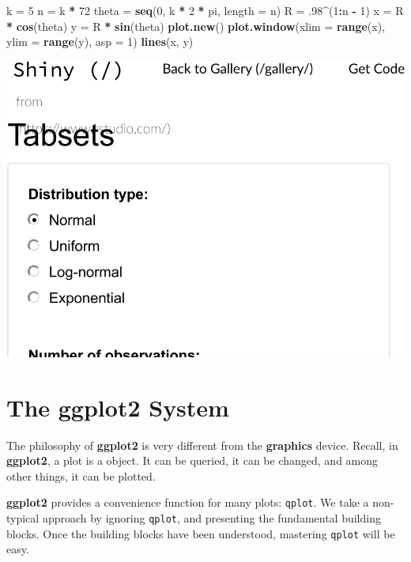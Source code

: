 \documentclass[]{book}
\newenvironment{Shaded}{\begin{snugshade}}{\end{snugshade}}
\newcommand{\DataTypeTok}[1]{\textcolor[rgb]{0.13,0.29,0.53}{#1}}
\newcommand{\DecValTok}[1]{\textcolor[rgb]{0.00,0.00,0.81}{#1}}
\newcommand{\FloatTok}[1]{\textcolor[rgb]{0.00,0.00,0.81}{#1}}
\newcommand{\KeywordTok}[1]{\textcolor[rgb]{0.13,0.29,0.53}{\textbf{#1}}}
\newcommand{\NormalTok}[1]{#1}
\newcommand{\OperatorTok}[1]{\textcolor[rgb]{0.81,0.36,0.00}{\textbf{#1}}}
\newcommand{\StringTok}[1]{\textcolor[rgb]{0.31,0.60,0.02}{#1}}
\theoremstyle{definition}
\theoremstyle{definition}
\theoremstyle{definition}
\theoremstyle{remark}
\begin{document}
\begin{Shaded}
\begin{Highlighting}[]
\NormalTok{k =}\StringTok{ }\DecValTok{5}
\NormalTok{n =}\StringTok{ }\NormalTok{k }\OperatorTok{*}\StringTok{ }\DecValTok{72}
\NormalTok{theta =}\StringTok{ }\KeywordTok{seq}\NormalTok{(}\DecValTok{0}\NormalTok{, k }\OperatorTok{*}\StringTok{ }\DecValTok{2} \OperatorTok{*}\StringTok{ }\NormalTok{pi, }\DataTypeTok{length =}\NormalTok{ n)}
\NormalTok{R =}\StringTok{ }\FloatTok{.98}\OperatorTok{^}\NormalTok{(}\DecValTok{1}\OperatorTok{:}\NormalTok{n }\OperatorTok{-}\StringTok{ }\DecValTok{1}\NormalTok{)}
\NormalTok{x =}\StringTok{ }\NormalTok{R }\OperatorTok{*}\StringTok{ }\KeywordTok{cos}\NormalTok{(theta)}
\NormalTok{y =}\StringTok{ }\NormalTok{R }\OperatorTok{*}\StringTok{ }\KeywordTok{sin}\NormalTok{(theta)}
\KeywordTok{plot.new}\NormalTok{()}
\KeywordTok{plot.window}\NormalTok{(}\DataTypeTok{xlim =} \KeywordTok{range}\NormalTok{(x), }\DataTypeTok{ylim =} \KeywordTok{range}\NormalTok{(y), }\DataTypeTok{asp =} \DecValTok{1}\NormalTok{)}
\KeywordTok{lines}\NormalTok{(x, y)}
\end{Highlighting}
\end{Shaded}

\includegraphics[width=0.5\linewidth]{Rcourse_files/figure-latex/unnamed-chunk-267-1}

\hypertarget{the-ggplot2-system}{%
\section{The ggplot2 System}\label{the-ggplot2-system}}

The philosophy of \textbf{ggplot2} is very different from the \textbf{graphics} device.
Recall, in \textbf{ggplot2}, a plot is a object.
It can be queried, it can be changed, and among other things, it can be plotted.

\textbf{ggplot2} provides a convenience function for many plots: \texttt{qplot}.
We take a non-typical approach by ignoring \texttt{qplot}, and presenting the fundamental building blocks.
Once the building blocks have been understood, mastering \texttt{qplot} will be easy.
\end{document}
